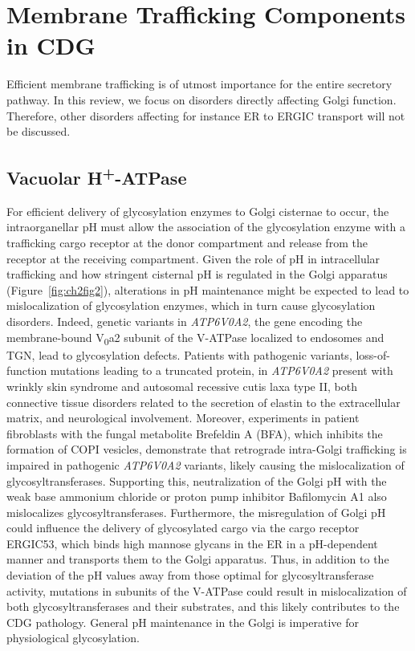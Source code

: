 \section{Membrane Trafficking Components in CDG}

Efficient membrane trafficking is of utmost importance for the entire secretory pathway. In this review, we focus on disorders directly affecting Golgi function. Therefore, other disorders affecting for instance ER to ERGIC transport will not be discussed.

\subsection{Vacuolar H\textsuperscript{+}-ATPase}

For efficient delivery of glycosylation enzymes to Golgi cisternae to occur, the intraorganellar pH must allow the association of the glycosylation enzyme with a trafficking cargo receptor at the donor compartment and release from the receptor at the receiving compartment. Given the role of pH in intracellular trafficking and how stringent cisternal pH is regulated in the Golgi apparatus (Figure~\ref{fig:ch2fig2})\cite{casey_sensors_2010}, alterations in pH maintenance might be expected to lead to mislocalization of glycosylation enzymes, which in turn cause glycosylation disorders. Indeed, genetic variants in \emph{ATP6V0A2}, the gene encoding the membrane-bound V\textsubscript{0}a2 subunit of the V-ATPase localized to endosomes and TGN\cite{pietrement_distinct_2006,hurtado-lorenzo_v-atpase_2006}, lead to glycosylation defects\cite{kornak_impaired_2008}. Patients with pathogenic variants, loss-of-function mutations leading to a truncated protein, in \emph{ATP6V0A2} present with wrinkly skin syndrome and autosomal recessive cutis laxa type II, both connective tissue disorders related to the secretion of elastin to the extracellular matrix, and neurological involvement. Moreover, experiments in patient fibroblasts with the fungal metabolite Brefeldin A (BFA), which inhibits the formation of COPI vesicles\cite{galea_high-content_2015}, demonstrate that retrograde intra-Golgi trafficking is impaired in pathogenic \emph{ATP6V0A2} variants, likely causing the mislocalization of glycosyltransferases. Supporting this, neutralization of the Golgi pH with the weak base ammonium chloride or proton pump inhibitor Bafilomycin A1 also mislocalizes glycosyltransferases\cite{axelsson_neutralization_2001}. Furthermore, the misregulation of Golgi pH could influence the delivery of glycosylated cargo via the cargo receptor ERGIC53, which binds high mannose glycans in the ER in a pH-dependent manner and transports them to the Golgi apparatus\cite{appenzeller_lectin_1999,appenzeller-herzog_ph-induced_2004,kamiya_molecular_2008,ben-tekaya_live_2005}. Thus, in addition to the deviation of the pH values away from those optimal for glycosyltransferase activity, mutations in subunits of the V-ATPase could result in mislocalization of both glycosyltransferases and their substrates, and this likely contributes to the CDG pathology. General pH maintenance in the Golgi is imperative for physiological glycosylation.

